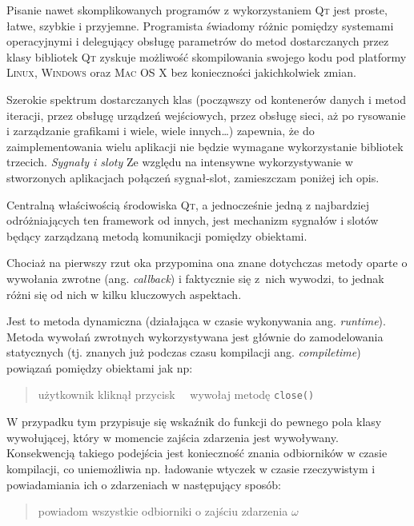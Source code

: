 Pisanie nawet skomplikowanych programów z wykorzystaniem \textsc{Qt} jest proste, łatwe, szybkie i przyjemne.
Programista świadomy różnic pomiędzy systemami operacyjnymi i delegujący obsługę parametrów do metod dostarczanych przez klasy bibliotek \textsc{Qt} zyskuje możliwość skompilowania swojego kodu pod platformy \textsc{Linux}, \textsc{Windows} oraz \textsc{Mac OS X} bez konieczności jakichkolwiek zmian.

Szerokie spektrum dostarczanych klas (począwszy od kontenerów danych i metod iteracji, przez obsługę urządzeń wejściowych, przez obsługę sieci, aż po rysowanie i zarządzanie grafikami i wiele, wiele innych\ldots) zapewnia, że do zaimplementowania wielu aplikacji nie będzie wymagane wykorzystanie bibliotek trzecich.
\newline
\newline
\textsl{Sygnały i sloty}
Ze względu na intensywne wykorzystywanie w stworzonych aplikacjach połączeń sygnał-slot, zamieszczam poniżej ich opis.

Centralną właściwością środowiska \textsc{Qt}, a jednocześnie jedną z najbardziej odróżniających ten framework od innych, jest mechanizm sygnałów i slotów będący zarządzaną metodą komunikacji pomiędzy obiektami.

Chociaż na pierwszy rzut oka przypomina ona znane dotychczas metody oparte o wywołania zwrotne (ang. \textsl{callback}) i faktycznie się z~nich wywodzi, to jednak różni się od nich w kilku kluczowych aspektach.

Jest to metoda dynamiczna (działająca w czasie wykonywania \ppauza ang. \textsl{runtime}).
Metoda wywołań zwrotnych wykorzystywana jest głównie do zamodelowania statycznych (tj. znanych już podczas czasu kompilacji \ppauza ang. \textsl{compiletime}) powiązań pomiędzy obiektami jak np:
\begin{verse}
użytkownik kliknął przycisk \texttimes~\textrightarrow~wywołaj metodę \texttt{close()}
\end{verse}

W przypadku tym przypisuje się wskaźnik do funkcji do pewnego pola klasy wywołującej, który w momencie zajścia zdarzenia jest wywoływany.
Konsekwencją takiego podejścia jest konieczność znania odbiorników w czasie kompilacji, co uniemożliwia np. ładowanie wtyczek w czasie rzeczywistym i powiadamiania ich o zdarzeniach w następujący sposób:
\begin{verse}
powiadom wszystkie odbiorniki o zajściu zdarzenia $\omega$
\end{verse}

